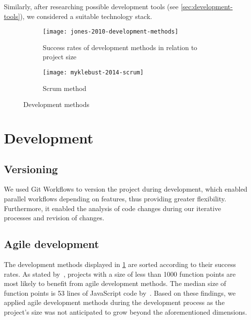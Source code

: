 Similarly, after researching possible development tools (see \cref{sec:development-tools}), we considered a suitable technology stack.

\begin{figure}[H]
    \begin{subfigure}[b]{\textwidth}
        \centering
        \texttt{[image: jones-2010-development-methods]}
        \caption[Success rates of development methods]{Success rates of development methods in relation to project size~\autocite[11]{jones_software_2010}}
        \label{fig:success-rates-development-methods}
    \end{subfigure}
    \begin{subfigure}[b]{\textwidth}
        \centering
        \texttt{[image: myklebust-2014-scrum]}
        \caption[Scrum method]{Scrum method~\autocite[2]{myklebust_scrum_nodate}}
        \label{fig:scrum-method}
    \end{subfigure}
    \caption{Development methods}\label{fig:development-methods}
\end{figure}

\section{Development}\label{sec:development}

\subsection{Versioning}\label{subsec:versioning}

We used Git Workflows to version the project during development, which enabled parallel workflows depending on features, thus providing greater flexibility.
Furthermore, it enabled the analysis of code changes during our iterative processes and revision of changes.

\subsection{Agile development}\label{subsec:agile-development}

The development methods displayed in \cref{fig:success-rates-development-methods} are sorted according to their success rates.
As stated by~\textcite[10-12]{jones_software_2010}, projects with a size of less than 1000 function points are most likely to benefit from agile development methods.
The median size of function points is 53 lines of JavaScript code by~\textcite{qsm_function_2009}.
Based on these findings, we applied agile development methods during the development process as the project's size was not anticipated to grow beyond the aforementioned dimensions.

